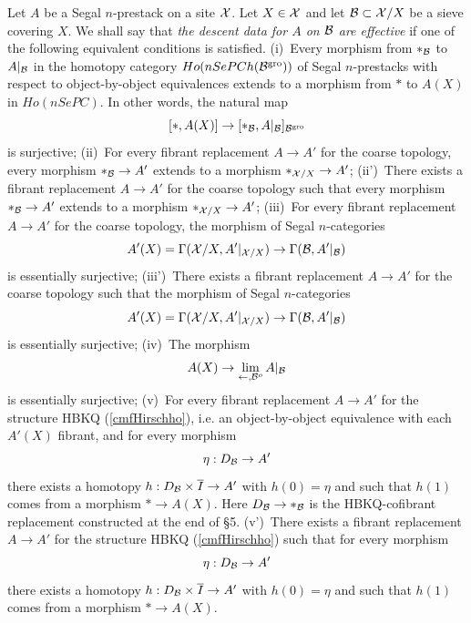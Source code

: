 \begin{lemmedefinition}
\label{lemmedef}
Let $A$ be a Segal $n$-prestack on a site ${\cal X}$. Let $X\in {\cal X}$ and let
${\cal B} \subset {\cal X} /X$ be a sieve covering $X$. We shall say that {\em the
descent data for $A$ on ${\cal B}$ are effective} if one of the following
equivalent conditions is satisfied.
\newline
(i)\, Every morphism from $\ast _{{\cal B}}$ to $A|_{{\cal B}}$ in the homotopy
category $Ho(nSePCh({\cal B} ^{\rm gro}))$ of Segal $n$-prestacks with respect to
object-by-object equivalences extends to a morphism from $\ast$ to $A(X)$ in
$Ho(nSePC)$. In other words, the natural map
$$
[\ast , A(X)]\rightarrow [\ast _{{\cal B}} , A|_{{\cal B}}]_{{\cal B} ^{\rm gro}}
$$
is surjective;
\newline
(ii)\, For every fibrant replacement $A\rightarrow A'$ for the coarse
topology, every morphism $\ast _{{\cal B}}\rightarrow A'$ extends to a morphism
$\ast _{{\cal X} /X}\rightarrow A'$;
\newline
(ii')\, There exists a fibrant replacement $A\rightarrow A'$ for the coarse
topology such that every morphism $\ast _{{\cal B}}\rightarrow A'$ extends to a
morphism $\ast _{{\cal X} /X}\rightarrow A'$;
\newline
(iii)\, For every fibrant replacement $A\rightarrow A'$ for the coarse
topology, the morphism of Segal $n$-categories
$$
A'(X)=\Gamma ({\cal X} /X , A'|_{{\cal X} /X})\rightarrow \Gamma ({\cal B} , A'|_{{\cal B}})
$$
is essentially surjective;
\newline
(iii')\, There exists a fibrant replacement $A\rightarrow A'$ for the coarse
topology such that the morphism of Segal $n$-categories
$$
A'(X)=\Gamma ({\cal X} /X , A'|_{{\cal X} /X})\rightarrow \Gamma ({\cal B} , A'|_{{\cal B}})
$$
is essentially surjective;
\newline
(iv)\, The morphism
$$
A(X)\rightarrow \lim _{\leftarrow , {\cal B} ^o} A|_{{\cal B} }
$$
is essentially surjective;
\newline
(v)\, For every fibrant replacement $A\rightarrow A'$ for the structure HBKQ
(\ref{cmfHirschho}), i.e. an object-by-object equivalence with each $A'(X)$
fibrant, and for every morphism
$$
\eta : D_{{\cal B}}\rightarrow A'
$$
there exists a homotopy $h: D_{{\cal B}}\times \overline{I}\rightarrow A'$ with
$h(0)=\eta$ and such that $h(1)$ comes from a morphism $\ast\rightarrow
A(X)$. Here $D_{{\cal B}}\rightarrow \ast _{{\cal B}}$ is the HBKQ-cofibrant
replacement constructed at the end of \S 5.
\newline
(v')\, There exists a fibrant replacement $A\rightarrow A'$ for the structure
HBKQ (\ref{cmfHirschho}) such that for every morphism
$$
\eta : D_{{\cal B}}\rightarrow A'
$$
there exists a homotopy $h: D_{{\cal B}}\times \overline{I}\rightarrow A'$ with
$h(0)=\eta$ and such that $h(1)$ comes from a morphism $\ast\rightarrow
A(X)$.


\end{lemmedefinition}
